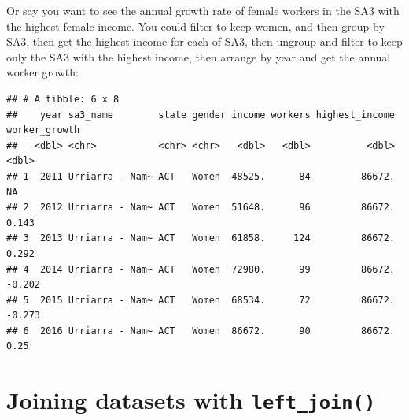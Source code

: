 \documentclass[]{book}
\newenvironment{Shaded}{\begin{snugshade}}{\end{snugshade}}
\newcommand{\DataTypeTok}[1]{\textcolor[rgb]{0.13,0.29,0.53}{#1}}
\newcommand{\DecValTok}[1]{\textcolor[rgb]{0.00,0.00,0.81}{#1}}
\newcommand{\KeywordTok}[1]{\textcolor[rgb]{0.13,0.29,0.53}{\textbf{#1}}}
\newcommand{\NormalTok}[1]{#1}
\newcommand{\OperatorTok}[1]{\textcolor[rgb]{0.81,0.36,0.00}{\textbf{#1}}}
\newcommand{\StringTok}[1]{\textcolor[rgb]{0.31,0.60,0.02}{#1}}
\begin{document}
Or say you want to see the annual growth rate of female workers in the SA3 with the highest female income. You could filter to keep women, and then group by SA3, then get the highest income for each of SA3, then ungroup and filter to keep only the SA3 with the highest income, then arrange by year and get the annual worker growth:

\begin{Shaded}
\end{Shaded}

\begin{verbatim}
## # A tibble: 6 x 8
##    year sa3_name        state gender income workers highest_income worker_growth
##   <dbl> <chr>           <chr> <chr>   <dbl>   <dbl>          <dbl>         <dbl>
## 1  2011 Urriarra - Nam~ ACT   Women  48525.      84         86672.        NA    
## 2  2012 Urriarra - Nam~ ACT   Women  51648.      96         86672.         0.143
## 3  2013 Urriarra - Nam~ ACT   Women  61858.     124         86672.         0.292
## 4  2014 Urriarra - Nam~ ACT   Women  72980.      99         86672.        -0.202
## 5  2015 Urriarra - Nam~ ACT   Women  68534.      72         86672.        -0.273
## 6  2016 Urriarra - Nam~ ACT   Women  86672.      90         86672.         0.25
\end{verbatim}

\hypertarget{joining-datasets-with-left_join}{%
\section{\texorpdfstring{Joining datasets with \texttt{left\_join()}}{Joining datasets with left\_join()}}\label{joining-datasets-with-left_join}}
\end{document}
